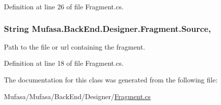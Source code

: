 Definition at line 26 of file Fragment.\+cs.

\hypertarget{class_mufasa_1_1_back_end_1_1_designer_1_1_fragment_ad50868eff627de922d3a66f1a0073429}{
\subsubsection[{Source}]{\setlength{\rightskip}{0pt plus 5cm}String Mufasa.\+Back\+End.\+Designer.\+Fragment.\+Source\hspace{0.3cm}{\ttfamily [get]}, {\ttfamily [set]}}}\label{class_mufasa_1_1_back_end_1_1_designer_1_1_fragment_ad50868eff627de922d3a66f1a0073429}
Path to the file or url containing the fragment. 

Definition at line 18 of file Fragment.\+cs.



The documentation for this class was generated from the following file\+:\begin{DoxyCompactItemize}
\item 
Mufasa/\+Mufasa/\+Back\+End/\+Designer/\hyperlink{_fragment_8cs}{Fragment.\+cs}\end{DoxyCompactItemize}
